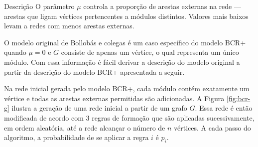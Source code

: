 \begin{section}{Descrição}
	O parâmetro $\mu$ controla a proporção de arestas externas na rede --- arestas que ligam vértices pertencentes a módulos distintos. Valores mais baixos levam a redes com menos arestas externas.

	O modelo original de Bollobás e colegas \cite{Bollobas2003} é um caso específico do modelo BCR+ quando $\mu = 0$ e $G$ consiste de apenas um vértice, o qual representa um único módulo. Com essa informação é fácil derivar a descrição do modelo original a partir da descrição do modelo BCR+ apresentada a seguir.
	
	Na rede inicial gerada pelo modelo BCR+, cada módulo contém exatamente um vértice e todas as arestas externas permitidas são adicionadas. A Figura \ref{fig:bcr-g} ilustra a geração de uma rede inicial a partir de um grafo $G$. Essa rede é então modificada de acordo com 3 regras de formação que são aplicadas sucessivamente, em ordem aleatória, até a rede alcançar o número de $n$ vértices. A cada passo do algoritmo, a probabilidade de se aplicar a regra $i$ é $p_i$.
	
\end{section}


